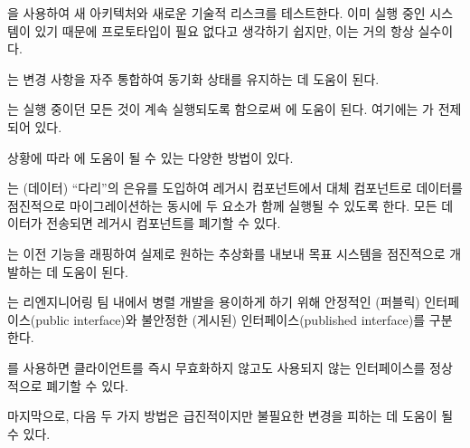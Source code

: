 \documentclass[a4paper,10pt,twoside]{book}
\begin{document}
\begin{bulletlist}
\item {}을 사용하여 새 아키텍처와 새로운 기술적 리스크를 테스트한다. 이미 실행 중인 시스템이 있기 때문에 프로토타입이 필요 없다고 생각하기 쉽지만, 이는 거의 항상 실수이다.

\item {}는 변경 사항을 자주 통합하여 동기화 상태를 유지하는 데 도움이 된다.

\item {}는 실행 중이던 모든 것이 계속 실행되도록 함으로써 에 도움이 된다. 여기에는 가 전제되어 있다.
\end{bulletlist}

상황에 따라 에 도움이 될 수 있는 다양한 방법이 있다.

\begin{bulletlist}
\item {}는 (데이터) ``다리''의 은유를 도입하여 레거시 컴포넌트에서 대체 컴포넌트로 데이터를 점진적으로 마이그레이션하는 동시에 두 요소가 함께 실행될 수 있도록 한다. 모든 데이터가 전송되면 레거시 컴포넌트를 폐기할 수 있다.

\item {}는 이전 기능을 래핑하여 실제로 원하는 추상화를 내보내 목표 시스템을 점진적으로 개발하는 데 도움이 된다.

\item {}는 리엔지니어링 팀 내에서 병렬 개발을 용이하게 하기 위해 안정적인 (퍼블릭) 인터페이스(public interface)와 불안정한 (게시된) 인터페이스(published interface)를 구분한다.

\item {}를 사용하면 클라이언트를 즉시 무효화하지 않고도 사용되지 않는 인터페이스를 정상적으로 폐기할 수 있다.
\end{bulletlist}

마지막으로, 다음 두 가지 방법은 급진적이지만 불필요한 변경을 피하는 데 도움이 될 수 있다.
\end{document}
